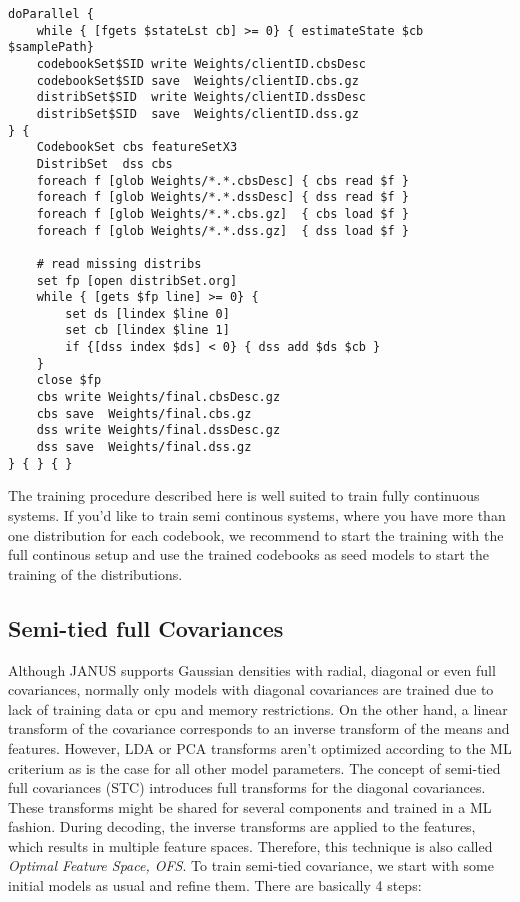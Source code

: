 \begin{verbatim}
doParallel { 
    while { [fgets $stateLst cb] >= 0} { estimateState $cb $samplePath} 
    codebookSet$SID write Weights/clientID.cbsDesc
    codebookSet$SID save  Weights/clientID.cbs.gz
    distribSet$SID  write Weights/clientID.dssDesc
    distribSet$SID  save  Weights/clientID.dss.gz
} {
    CodebookSet cbs featureSetX3
    DistribSet  dss cbs
    foreach f [glob Weights/*.*.cbsDesc] { cbs read $f }
    foreach f [glob Weights/*.*.dssDesc] { dss read $f }
    foreach f [glob Weights/*.*.cbs.gz]  { cbs load $f }
    foreach f [glob Weights/*.*.dss.gz]  { dss load $f }

    # read missing distribs
    set fp [open distribSet.org] 
    while { [gets $fp line] >= 0} {
        set ds [lindex $line 0]
        set cb [lindex $line 1]
        if {[dss index $ds] < 0} { dss add $ds $cb }
    }
    close $fp
    cbs write Weights/final.cbsDesc.gz
    cbs save  Weights/final.cbs.gz
    dss write Weights/final.dssDesc.gz
    dss save  Weights/final.dss.gz
} { } { }    
\end{verbatim}

The training  procedure described here  is well  suited to  train fully
continuous  systems.   If you'd like to    train semi continous systems,
where  you have  more  than  one distribution  for  each codebook,  we
recommend to start the training with the  full continous setup and use
the   trained codebooks as  seed models  to start the  training of the
distributions.

\subsection{Semi-tied full Covariances}

Although JANUS supports Gaussian  densities with radial, diagonal  or
even full covariances, normally only  models with diagonal covariances
are  trained  due  to   lack of  training   data  or cpu   and  memory
restrictions. On the other hand, a  linear transform of the covariance
corresponds to an inverse transform of the means and features. However,
LDA or PCA  transforms aren't optimized according  to the ML criterium
as is the case for all other model parameters. The concept of semi-tied full
covariances  (STC)   introduces   full  transforms  for the    diagonal
covariances. These transforms might  be shared for several  components
and trained  in a ML fashion. During  decoding, the inverse transforms
are   applied  to the   features,  which results  in  multiple feature
spaces. Therefore, this technique  is also called {\em Optimal Feature
Space, OFS}. To train semi-tied covariance, we start with some initial
models as usual and refine them. There are basically 4 steps:

